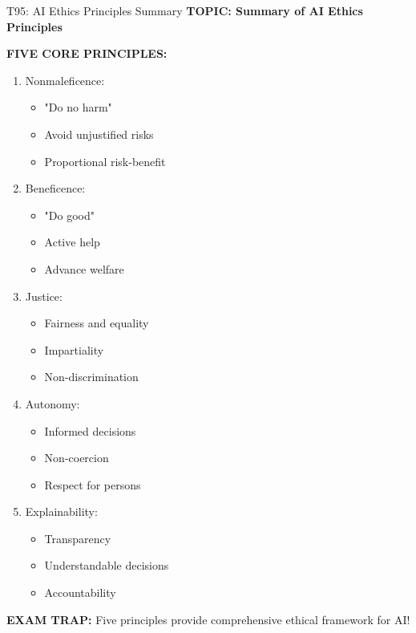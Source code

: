 \documentclass[8pt]{beamer}
\begin{document}
	\begin{frame}{T95: AI Ethics Principles Summary}
		\fontsize{6.5}{7.5}\selectfont
		\textbf{TOPIC: Summary of AI Ethics Principles}
		
		\vspace{0.1cm}
		\textbf{FIVE CORE PRINCIPLES:}
		\begin{enumerate}
			\item \textcolor{myblue}{Nonmaleficence:}
			\begin{itemize}
				\item "Do no harm"
				\item Avoid unjustified risks
				\item Proportional risk-benefit
			\end{itemize}
			\item \textcolor{myblue}{Beneficence:}
			\begin{itemize}
				\item "Do good"
				\item Active help
				\item Advance welfare
			\end{itemize}
			\item \textcolor{myblue}{Justice:}
			\begin{itemize}
				\item Fairness and equality
				\item Impartiality
				\item Non-discrimination
			\end{itemize}
			\item \textcolor{myblue}{Autonomy:}
			\begin{itemize}
				\item Informed decisions
				\item Non-coercion
				\item Respect for persons
			\end{itemize}
			\item \textcolor{myblue}{Explainability:}
			\begin{itemize}
				\item Transparency
				\item Understandable decisions
				\item Accountability
			\end{itemize}
		\end{enumerate}
		
		\textcolor{myred}{\textbf{EXAM TRAP:}} Five principles provide \textcolor{myblue}{comprehensive ethical framework} for AI!
	\end{frame}
	
\end{document}
